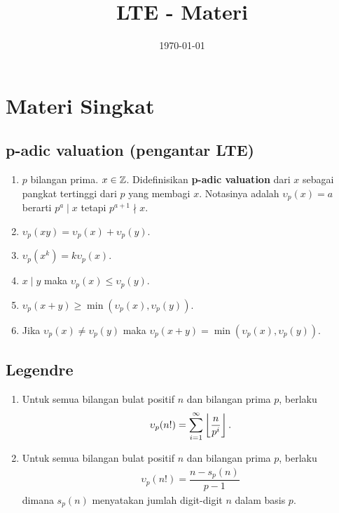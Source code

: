 \documentclass[11pt]{scrartcl}
\title{LTE - Materi}
\date{\today}
\begin{document}
\maketitle

\section{Materi Singkat}
\subsection{p-adic valuation (pengantar LTE)}
\begin{enumerate}
    \item $p$ bilangan prima. $x \in \mathbb Z$. Didefinisikan \textbf{p-adic valuation} dari $x$ sebagai pangkat tertinggi dari $p$ yang membagi $x$. Notasinya adalah $\upsilon_p(x)=a$ berarti $p^a \mid x$ tetapi $p^{a+1} \nmid x$.
    \item $\upsilon_p(xy) = \upsilon_p(x) + \upsilon_p(y)$.
    \item $\upsilon_p(x^k)=k\upsilon_p(x)$.
    \item $x \mid y$ maka $\upsilon_p(x) \le \upsilon_p(y)$.
    \item $\upsilon_p(x+y) \ge \min(\upsilon_p(x),\upsilon_p(y))$.
    \item Jika $\upsilon_p(x) \neq \upsilon_p(y)$ maka $\upsilon_p(x+y) = \min(\upsilon_p(x),\upsilon_p(y))$.
\end{enumerate}

\subsection{Legendre}
\begin{enumerate}
    \item Untuk semua bilangan bulat positif $n$ dan bilangan prima $p$, berlaku
\begin{align*}
    \upsilon_p(n!) = \sum_{i=1}^{\infty} \left\lfloor \frac{n}{p^i} \right\rfloor.
\end{align*}

    \item Untuk semua bilangan bulat positif $n$ dan bilangan prima $p$, berlaku
\begin{align*}
    \upsilon_p(n!) = \dfrac{n-s_p(n)}{p-1}
\end{align*}
    dimana $s_p(n)$ menyatakan jumlah digit-digit $n$ dalam basis $p$.
\end{enumerate}
\end{document}

